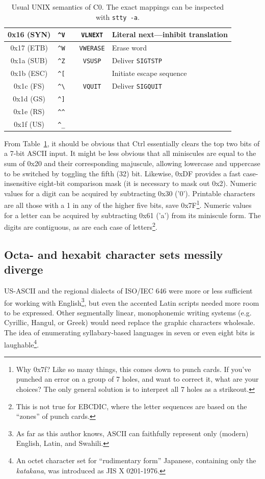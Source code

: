 \begin{table}[!htb]
\begin{tabular}{ |c|c|c|c|l| }
    \hline
    0x16 (SYN) & \texttt{\^{}V} & & \texttt{VLNEXT} & Literal next---inhibit translation\\
    \hline
    0x17 (ETB) & \texttt{\^{}W} & & \texttt{VWERASE} & Erase word \\
    \hline
    0x1a (SUB) & \texttt{\^{}Z} & & \texttt{VSUSP} & Deliver \texttt{SIGTSTP} \\
    \hline
    0x1b (ESC) & \texttt{\^{}[} & & & Initiate escape sequence \\
    \hline
    0x1c (FS) & \texttt{\^{}\textbackslash{}} & & \texttt{VQUIT} & Deliver \texttt{SIGQUIT} \\
    \hline
    0x1d (GS) & \texttt{\^{}]} & & & \\
    \hline
    0x1e (RS) & \texttt{\^{}\^{}} & & & \\
    \hline
    0x1f (US) & \texttt{\^{}\_} & & & \\
    \hline
  \end{tabular}
  \caption[Usual UNIX semantics of C0]{Usual UNIX semantics of C0. The exact mappings can be inspected with \texttt{stty -a}.}
  \label{table:c0maps}
\end{table}

From Table~\ref{table:c0maps}, it should be obvious that Ctrl essentially clears
the top two bits of a 7-bit ASCII input. It might be less obvious that all
miniscules are equal to the sum of 0x20 and their corresponding majuscule,
allowing lowercase and uppercase to be switched by toggling the fifth (32) bit.
Likewise, 0xDF provides a fast case-insensitive eight-bit comparison mask (it
is necessary to mask out 0x2). Numeric values
for a digit can be acquired by subtracting 0x30 ('0'). Printable characters are all
those with a 1 in any of the higher five bits, save 0x7F\footnote{Why 0x7f? Like
so many things, this comes down to punch cards. If you've punched an error on
a group of 7 holes, and want to correct it, what are your choices? The only
general solution is to interpret all 7 holes as a strikeout\cite{cardpunch}.}. Numeric values for a
letter can be acquired by subtracting 0x61 ('a') from its miniscule form. The
digits are contiguous, as are each case of letters\footnote{This is not true for
EBCDIC, where the letter sequences are based on the ``zones'' of punch cards\cite{nickgammon}.}.

\subsection{Octa- and hexabit character sets messily diverge}
US-ASCII and the regional dialects of ISO/IEC 646 were more or less sufficient
for working with English\footnote{As far as this author knows, ASCII
can faithfully represent only (modern) English, Latin, and Swahili.}, but even
the accented Latin scripts needed more room to be expressed. Other
segmentally linear, monophonemic writing systems (e.g. Cyrillic, Hangul, or
Greek) would need replace the graphic characters wholesale. The idea of
enumerating syllabary-based languages in seven or even eight bits is
laughable\footnote{An octet character set for ``rudimentary form'' Japanese,
containing only the \textit{katakana}, was introduced as JIS X 0201-1976.}.

